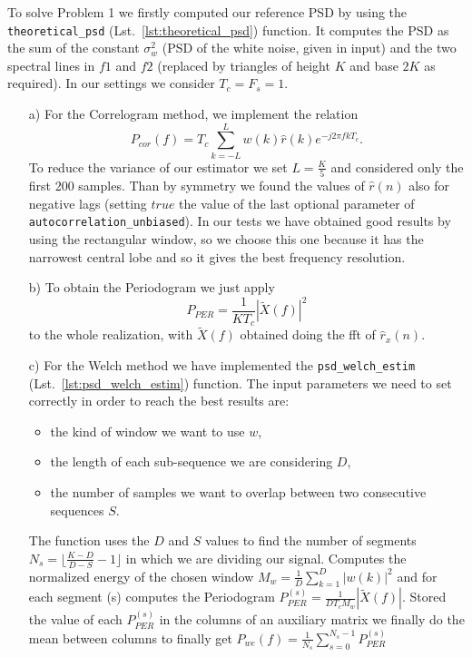 \documentclass{article}
\newcommand{\inlinecode}[1]{\lstinline[basicstyle=\ttfamily,
    keywordstyle={}]{#1}}
\newcommand{\abs}[1]{\left|#1\right|}
\begin{document}
To solve Problem 1 we firstly computed our reference PSD by using the \inlinecode{theoretical_psd} (Lst.~\ref{lst:theoretical_psd}) function. It computes the PSD as the sum of the constant $\sigma_w^2$ (PSD of the white noise, given in input) and the two spectral lines in $f1$ and $f2$ (replaced by triangles of height $K$ and base $2K$ as required). In our settings we consider $T_c = F_s = 1$.
\begin{itemize}
\item[a)] For the Correlogram method, we implement the relation
  \[ P_{cor}(f) = T_c \sum_{k=-L}^{L} w(k)\hat{r}(k)e^{-j 2 \pi  f k T_c} . \]
  To reduce the variance of our estimator we set $L=\frac{K}{5}$ and considered only the first 200 samples. Than by symmetry we found the values of $\hat{r}(n)$ also for negative lags (setting $true$ the value of the last optional parameter of \inlinecode{autocorrelation_unbiased}). In our tests we have obtained good results by using the rectangular window, so we choose this one because it has the narrowest central lobe and so it gives the best frequency resolution.
 \item[b)] To obtain the Periodogram we just apply
   \[ P_{PER} = \frac{1}{K T_c} |\tilde{X}(f)|^2 \]
   to the whole realization, with $\tilde{X}(f)$ obtained doing the fft of $\hat{r}_x(n)$.
 \item[c)] For the Welch method we have implemented the \inlinecode{psd_welch_estim} (Lst.~\ref{lst:psd_welch_estim}) function. The input parameters we need to set correctly in order to reach the best results are:
 \begin{itemize}
 \item the kind of window we want to use $w$,
 \item the length of each sub-sequence we are considering $D$, 
 \item the number of samples we want to overlap between two consecutive sequences $S$. 
\end{itemize} 
The function uses the $D$ and $S$ values to find the number of segments $N_s = \bigl\lfloor \frac{K-D}{D-S} -1\bigl\rfloor $ in which we are dividing our signal. Computes the normalized energy of the chosen window $M_w = \frac{1}{D} \sum_{k=1}^{D} {\abs{w(k)}^2} $ and for each segment (s) computes the Periodogram $P_{PER}^{(s)} = \frac{1}{D T_c M_w} |\tilde{X}(f)|$. Stored the value of each $P_{PER}^{(s)}$ in the columns of an auxiliary matrix we finally do the mean between columns to finally get $P_{we}(f) = \frac{1}{N_s} \sum_{s=0}^{N_s-1} P_{PER}^{(s)} $

\end{itemize}
\end{document}
